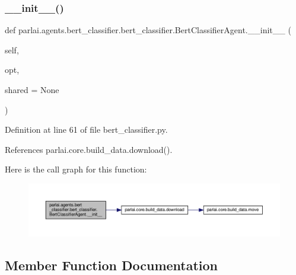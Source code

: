 \subsubsection{\texorpdfstring{\+\_\+\+\_\+init\+\_\+\+\_\+()}{\_\_init\_\_()}}
{\footnotesize\ttfamily def parlai.\+agents.\+bert\+\_\+classifier.\+bert\+\_\+classifier.\+Bert\+Classifier\+Agent.\+\_\+\+\_\+init\+\_\+\+\_\+ (\begin{DoxyParamCaption}\item[{}]{self,  }\item[{}]{opt,  }\item[{}]{shared = {\ttfamily None} }\end{DoxyParamCaption})}



Definition at line 61 of file bert\+\_\+classifier.\+py.



References parlai.\+core.\+build\+\_\+data.\+download().

Here is the call graph for this function\+:
\nopagebreak
\begin{figure}[H]
\begin{center}
\leavevmode
\includegraphics[width=350pt]{classparlai_1_1agents_1_1bert__classifier_1_1bert__classifier_1_1BertClassifierAgent_ac05f1d52c400de5b60284121b4a49746_cgraph}
\end{center}
\end{figure}


\subsection{Member Function Documentation}
\mbox{\label{classparlai_1_1agents_1_1bert__classifier_1_1bert__classifier_1_1BertClassifierAgent_a461c2531f3428f00804184df95dd6070}} 
